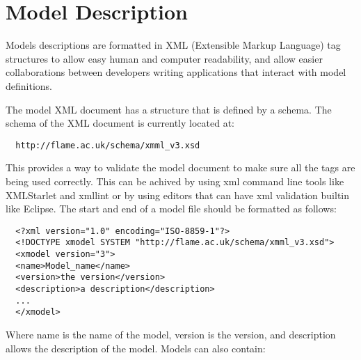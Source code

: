 \section{Model Description}
\label{sec:model_description}

Models descriptions are formatted in XML (Extensible Markup Language) tag
structures to allow easy human and computer readability, and allow easier collaborations between
developers writing applications that interact with model definitions.

The model XML document has a structure that is defined by a schema.
The schema of the XML document is currently located
at:

\begin{verbatim}
  http://flame.ac.uk/schema/xmml_v3.xsd
\end{verbatim}

This provides a way to validate the model document to make sure all the tags are
being used correctly. This can be achived by using xml command line tools like
XMLStarlet and xmllint or by using editors that
can have xml validation builtin like Eclipse. The start and end
of a model file should be formatted as follows:

\begin{verbatim}
  <?xml version="1.0" encoding="ISO-8859-1"?>
  <!DOCTYPE xmodel SYSTEM "http://flame.ac.uk/schema/xmml_v3.xsd">
  <xmodel version="3">
  <name>Model_name</name>
  <version>the version</version>
  <description>a description</description>
  ...
  </xmodel>
\end{verbatim}

Where name is the name of the model, version is the version, and description
allows the description of the model. Models can also contain:

